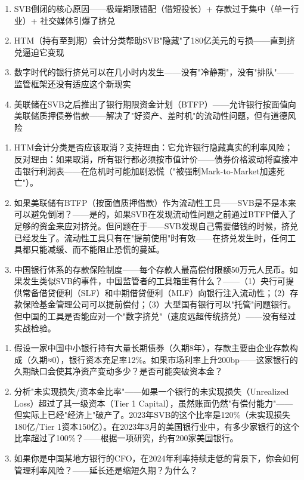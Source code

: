 \documentclass[a4paper,11pt]{ctexbook}
\begin{document}
\begin{lessonsummary}
\begin{enumerate}
  \item SVB倒闭的核心原因——极端期限错配（借短投长）+ 存款过于集中（单一行业）+ 社交媒体引爆了挤兑
  \item HTM（持有至到期）会计分类帮助SVB"隐藏"了180亿美元的亏损——直到挤兑逼迫它变现
  \item 数字时代的银行挤兑可以在几小时内发生——没有"冷静期"，没有"排队"——监管框架还没有适应这个新现实
  \item 美联储在SVB之后推出了银行期限资金计划（BTFP）——允许银行按面值向美联储质押债券借款——解决了"好资产、差时机"的流动性问题，但有道德风险
\end{enumerate}
\end{lessonsummary}

\begin{discuss}
\begin{enumerate}
  \item HTM会计分类是否应该取消？支持理由：它允许银行隐藏真实的利率风险；反对理由：如果取消，所有银行都必须按市值计价——债券价格波动将直接冲击银行利润表——在危机时可能加剧恐慌（"被强制Mark-to-Market加速死亡"）。
  \item 如果美联储有BTFP（按面值质押借款）作为流动性工具——SVB是不是本来可以避免倒闭？——是的，如果SVB在发现流动性问题之前通过BTFP借入了足够的资金来应对挤兑。但问题在于——SVB发现自己需要借钱的时候，挤兑已经发生了。流动性工具只有在"提前使用"时有效——在挤兑发生时，任何工具都只能减缓、而不能阻止恐慌的蔓延。
  \item 中国银行体系的存款保险制度——每个存款人最高偿付限额50万元人民币。如果发生类似SVB的事件，中国监管者的工具箱里有什么？——（1）央行可提供常备借贷便利（SLF）和中期借贷便利（MLF）向银行注入流动性；（2）存款保险基金管理公司可以提前偿付；（3）大型国有银行可以"托管"问题银行。但中国的工具是否能应对一个"数字挤兑"（速度远超传统挤兑）——没有经过实战检验。
\end{enumerate}
\end{discuss}

\begin{exercises}
\begin{enumerate}
  \item 假设一家中国中小银行持有大量长期债券（久期8年），存款主要由企业存款构成（久期≈0），银行资本充足率12\%。如果市场利率上升200bp——这家银行的久期缺口会使其净资产变动多少？是否可能突破资本金？
  \item 分析"未实现损失/资本金比率"——如果一个银行的未实现损失（Unrealized Loss）超过了其一级资本（Tier 1 Capital），虽然账面仍然"有偿付能力"——但实际上已经"经济上"破产了。2023年SVB的这个比率是120\%（未实现损失180亿/Tier 1资本150亿）。在2023年3月的美国银行业中，有多少家银行的这个比率超过了100\%？——根据一项研究，约有200家美国银行。
  \item 如果你是中国某地方银行的CFO，在2024年利率持续走低的背景下，你会如何管理利率风险？——延长还是缩短久期？为什么？
\end{enumerate}
\end{exercises}
\end{document}
